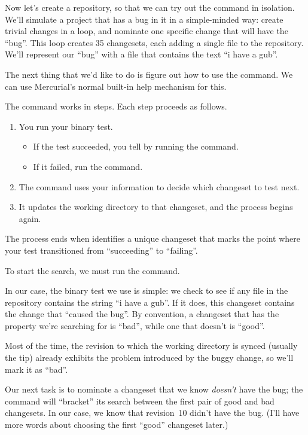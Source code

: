 Now let's create a repository, so that we can try out the
 command in isolation.
We'll simulate a project that has a bug in it in a simple-minded way:
create trivial changes in a loop, and nominate one specific change
that will have the ``bug''.  This loop creates 35 changesets, each
adding a single file to the repository.  We'll represent our ``bug''
with a file that contains the text ``i have a gub''.

The next thing that we'd like to do is figure out how to use the
 command.  We can use Mercurial's normal built-in help
mechanism for this.

The  command works in steps.  Each step proceeds as follows.
\begin{enumerate}
\item You run your binary test.
  \begin{itemize}
  \item If the test succeeded, you tell  by running the
     command.
  \item If it failed, run the  command.
  \end{itemize}
\item The command uses your information to decide which changeset to
  test next.
\item It updates the working directory to that changeset, and the
  process begins again.
\end{enumerate}
The process ends when  identifies a unique changeset
that marks the point where your test transitioned from ``succeeding''
to ``failing''.

To start the search, we must run the  command.

In our case, the binary test we use is simple: we check to see if any
file in the repository contains the string ``i have a gub''.  If it
does, this changeset contains the change that ``caused the bug''.  By
convention, a changeset that has the property we're searching for is
``bad'', while one that doesn't is ``good''.

Most of the time, the revision to which the working directory is
synced (usually the tip) already exhibits the problem introduced by
the buggy change, so we'll mark it as ``bad''.

Our next task is to nominate a changeset that we know \emph{doesn't}
have the bug; the  command will ``bracket'' its search
between the first pair of good and bad changesets.  In our case, we
know that revision~10 didn't have the bug.  (I'll have more words
about choosing the first ``good'' changeset later.)

